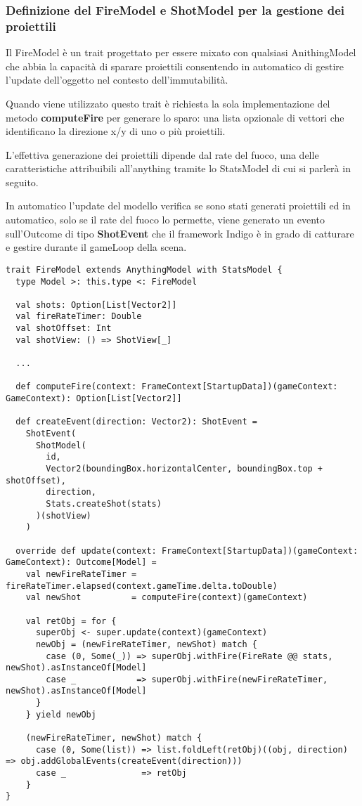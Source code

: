 \subsubsection{Definizione del FireModel e ShotModel per la gestione dei proiettili}
Il FireModel è un trait progettato per essere mixato con qualsiasi AnithingModel
che abbia la capacità di sparare proiettili consentendo in automatico di gestire l'update dell'oggetto nel contesto dell'immutabilità.

Quando viene utilizzato questo trait è richiesta la sola implementazione del metodo \textbf{computeFire} per generare lo sparo: 
una lista opzionale di vettori che identificano la direzione x/y di uno o più proiettili. 

L'effettiva generazione dei proiettili dipende dal rate del fuoco, 
una delle caratteristiche attribuibili all'anything tramite lo StatsModel di cui si parlerà in seguito.

In automatico l'update del modello verifica se sono stati generati proiettili ed in automatico, 
solo se il rate del fuoco lo permette, viene generato un evento sull'Outcome di tipo \textbf{ShotEvent}
che il framework Indigo è in grado di catturare e gestire durante il gameLoop della scena.

\begin{lstlisting}[basicstyle=\tiny]
trait FireModel extends AnythingModel with StatsModel {
  type Model >: this.type <: FireModel

  val shots: Option[List[Vector2]]
  val fireRateTimer: Double
  val shotOffset: Int
  val shotView: () => ShotView[_]

  ...

  def computeFire(context: FrameContext[StartupData])(gameContext: GameContext): Option[List[Vector2]]

  def createEvent(direction: Vector2): ShotEvent =
    ShotEvent(
      ShotModel(
        id,
        Vector2(boundingBox.horizontalCenter, boundingBox.top + shotOffset),
        direction,
        Stats.createShot(stats)
      )(shotView)
    )

  override def update(context: FrameContext[StartupData])(gameContext: GameContext): Outcome[Model] =
    val newFireRateTimer = fireRateTimer.elapsed(context.gameTime.delta.toDouble)
    val newShot          = computeFire(context)(gameContext)

    val retObj = for {
      superObj <- super.update(context)(gameContext)
      newObj = (newFireRateTimer, newShot) match {
        case (0, Some(_)) => superObj.withFire(FireRate @@ stats, newShot).asInstanceOf[Model]
        case _            => superObj.withFire(newFireRateTimer, newShot).asInstanceOf[Model]
      }
    } yield newObj

    (newFireRateTimer, newShot) match {
      case (0, Some(list)) => list.foldLeft(retObj)((obj, direction) => obj.addGlobalEvents(createEvent(direction)))
      case _               => retObj
    }
}
\end{lstlisting}

